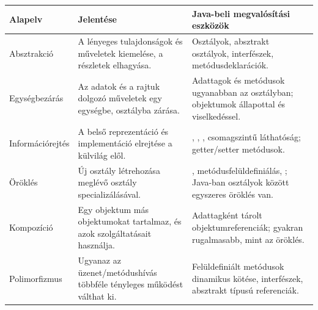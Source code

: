 \begin{tabularx}{\textwidth}{L{30mm}X X}
\toprule
\textbf{Alapelv} & \textbf{Jelentése} & \textbf{Java-beli megvalósítási eszközök} \\
\midrule
Absztrakció & A lényeges tulajdonságok és műveletek kiemelése, a részletek elhagyása. & Osztályok, absztrakt osztályok, interfészek, metódusdeklarációk. \\
Egységbezárás & Az adatok és a rajtuk dolgozó műveletek egy egységbe, osztályba zárása. & Adattagok és metódusok ugyanabban az osztályban; objektumok állapottal és viselkedéssel. \\
Információrejtés & A belső reprezentáció és implementáció elrejtése a külvilág elől. & , , , csomagszintű láthatóság; getter/setter metódusok. \\
Öröklés & Új osztály létrehozása meglévő osztály specializálásával. & , metódusfelüldefiniálás, ; Java-ban osztályok között egyszeres öröklés van. \\
Kompozíció & Egy objektum más objektumokat tartalmaz, és azok szolgáltatásait használja. & Adattagként tárolt objektumreferenciák; gyakran rugalmasabb, mint az öröklés. \\
Polimorfizmus & Ugyanaz az üzenet/metódushívás többféle tényleges működést válthat ki. & Felüldefiniált metódusok dinamikus kötése, interfészek, absztrakt típusú referenciák. \\
\bottomrule
\end{tabularx}
